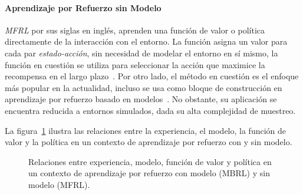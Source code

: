 \paragraph{Aprendizaje por Refuerzo sin Modelo}
\textit{MFRL} por sus siglas en inglés, aprenden una función de valor o política directamente de la interacción con el entorno.
La función asigna un valor para cada par \textit{estado-acción}, sin necesidad de modelar el entorno en sí mismo, la función en cuestión se utiliza para seleccionar la acción que maximice la recompensa en el largo plazo~\cite{benchmarking_2019, Sutton2018}.
Por otro lado, el método en cuestión es el enfoque más popular en la actualidad, incluso se usa como bloque de construcción en aprendizaje por refuerzo basado en modelos~\cite{Sutton2018}.
No obstante, su aplicación se encuentra reducida a entornos simulados, dada su alta complejidad de muestreo.

La figura~\ref{fig:MFRL_MBRL_diagram} ilustra las relaciones entre la experiencia, el modelo, la función de valor y la política en un contexto de aprendizaje por refuerzo con y sin modelo.

\begin{figure}[H]
    \centering
    \caption{Relaciones entre {experiencia}, {modelo}, {función de valor} y {política} en un contexto de aprendizaje por refuerzo con modelo (MBRL) y sin modelo (MFRL).}
    \label{fig:MFRL_MBRL_diagram}
\end{figure}

